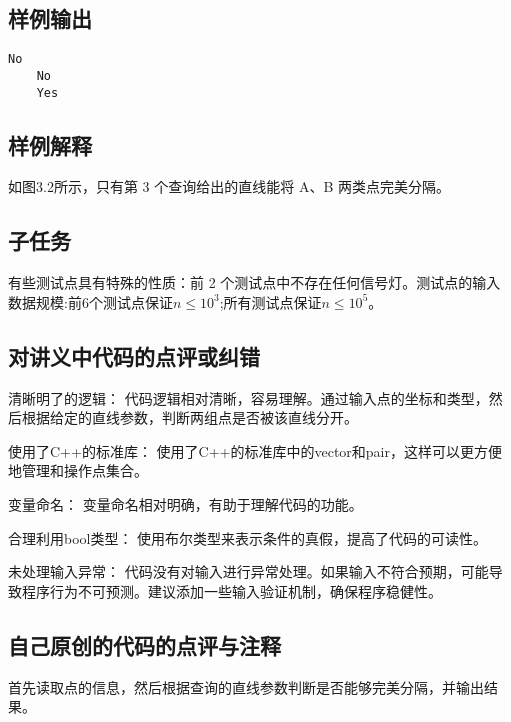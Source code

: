 \subsection{样例输出}

\begin{lstlisting}[numbers=none]
    No
    No
    Yes
\end{lstlisting}

\subsection{样例解释}

如图3.2所示，只有第 3 个查询给出的直线能将 A、B 两类点完美分隔。

\subsection{子任务}

有些测试点具有特殊的性质：前 2 个测试点中不存在任何信号灯。测试点的输入数据规模:前6个测试点保证$n ≤ 10^3$;所有测试点保证$n ≤ 10^5$。

\subsection{对讲义中代码的点评或纠错}
 
清晰明了的逻辑： 代码逻辑相对清晰，容易理解。通过输入点的坐标和类型，然后根据给定的直线参数，判断两组点是否被该直线分开。

使用了C++的标准库： 使用了C++的标准库中的vector和pair，这样可以更方便地管理和操作点集合。

变量命名： 变量命名相对明确，有助于理解代码的功能。

合理利用bool类型： 使用布尔类型来表示条件的真假，提高了代码的可读性。

未处理输入异常： 代码没有对输入进行异常处理。如果输入不符合预期，可能导致程序行为不可预测。建议添加一些输入验证机制，确保程序稳健性。

\subsection{自己原创的代码的点评与注释}

首先读取点的信息，然后根据查询的直线参数判断是否能够完美分隔，并输出结果。

